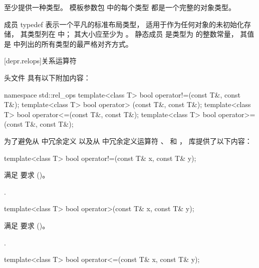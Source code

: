 \begin{itemdescr}
\pnum
\mandates
至少提供一种类型。
模板参数包  中的每个类型
都是一个完整的对象类型。

\pnum
成员 typedef  表示一个平凡的标准布局类型，
适用于作为任何对象的未初始化存储，
其类型列在  中；
其大小应至少为 。
静态成员 
是类型为  的整数常量，
其值是  中列出的所有类型的最严格对齐方式。
\end{itemdescr}

[depr.relops]{关系运算符}%
%

\pnum
头文件  具有以下附加内容：

\begin{codeblock}
namespace std::rel_ops {
  template<class T> bool operator!=(const T&, const T&);
  template<class T> bool operator> (const T&, const T&);
  template<class T> bool operator<=(const T&, const T&);
  template<class T> bool operator>=(const T&, const T&);
}
\end{codeblock}

\pnum
为了避免从  中冗余定义 
以及从  中冗余定义运算符 \tcode{>}、\tcode{<=} 和 \tcode{>=}，
库提供了以下内容：

%
\begin{itemdecl}
template<class T> bool operator!=(const T& x, const T& y);
\end{itemdecl}

\begin{itemdescr}
\pnum
\expects
{} 满足  要求 ()。

\pnum
\returns
{}.
\end{itemdescr}

%
\begin{itemdecl}
template<class T> bool operator>(const T& x, const T& y);
\end{itemdecl}

\begin{itemdescr}
\pnum
\expects
{} 满足  要求 ()。

\pnum
\returns
{}.
\end{itemdescr}

%
\begin{itemdecl}
template<class T> bool operator<=(const T& x, const T& y);
\end{itemdecl}


